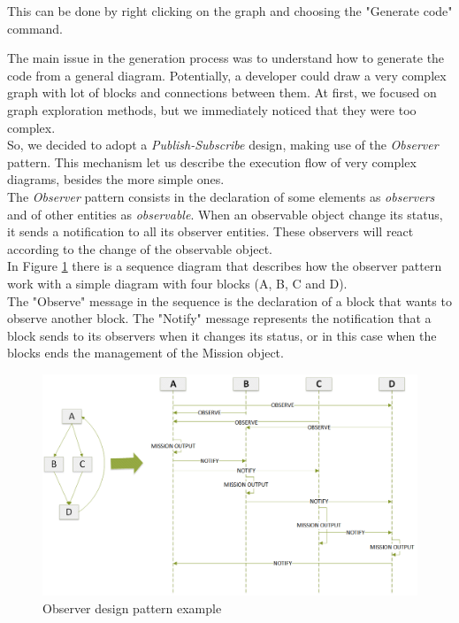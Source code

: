 This can be done by right clicking on the graph and choosing the "Generate code" command.

The main issue in the generation process was to understand how to generate the code from a general diagram. 
Potentially, a developer could draw a very complex graph with lot of blocks and connections between them.
At first, we focused on graph exploration methods, but we immediately noticed that they were too complex.
\\

So, we decided to adopt a \textit{Publish-Subscribe} design, making use of the \textit{Observer} pattern. This mechanism let us describe the execution flow of very complex diagrams, besides the more simple ones.
\\
 
The \textit{Observer} pattern consists in the declaration of some elements as \textit{observers} and of other entities as \textit{observable}. 
When an observable object change its status, it sends a notification to all its observer entities. 
These observers will react according to the change of the observable object.
\\

In Figure \ref{fig:observerPattern} there is a sequence diagram that describes how the observer pattern work with a simple diagram with four blocks (A, B, C and D).
\\
The "Observe" message in the sequence is the declaration of a block that wants to observe another block. The "Notify" message represents the notification that a block sends to its observers when it changes its status, or in this case when the blocks ends the management of the Mission object.
\\

 \begin{figure}
 \includegraphics[width=\linewidth]
 {pictures/pub_sub.png}
 \caption{Observer design pattern example}
 \label{fig:observerPattern}
 \end{figure}

